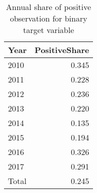 \begin{table}[ht]
\centering
\begin{tabular}{lr}
  \hline
Year & PositiveShare \\ 
  \hline
2010 & 0.345 \\ 
  2011 & 0.228 \\ 
  2012 & 0.236 \\ 
  2013 & 0.220 \\ 
  2014 & 0.135 \\ 
  2015 & 0.194 \\ 
  2016 & 0.326 \\ 
  2017 & 0.291 \\ 
  Total & 0.245 \\ 
   \hline
\end{tabular}
\caption{Annual share of positive observation for binary target variable} 
\label{tab:balance-overview}
\end{table}
